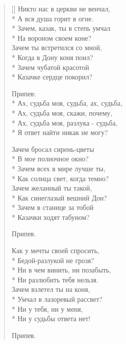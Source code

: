\documentclass[a4paper,oneside,14pt]{scrbook}
\begin{document}
        
    \settowidth{\versewidth}{Никто нас в церкви не венчал}
    \begin{verse}[\versewidth]
        Никто нас в церкви не венчал,\\*
        А вся душа горит в огне.\\*
        Зачем, казак, ты в степь умчал\\*
        На вороном своем коне?\\
        Зачем ты встретился со мной,\\*
        Когда в Дону коня поил?\\*
        Зачем чубатой красотой\\*
        Казачке сердце покорил? 

        \vin Припев:\\*
        \vin Ах, судьба моя, судьба, ах, судьба,\\*
        \vin Ах, судьба моя, скажи, почему,\\*
        \vin Ах, судьба моя, разлука - судьба,\\*
        \vin Я ответ найти никак не могу?

        Зачем бросал сирень-цветы\\*
        В мое полночное окно?\\*
        Зачем всех в мире лучше ты,\\*
        Как солнца свет, когда темно?\\
        Зачем желанный ты такой,\\*
        Как синеглазый вешний Дон?\\*
        Зачем в станице за тобой\\*
        Казачки ходят табуном? 

        \vin Припев. 
        
        Как у мечты своей спросить,\\*
        Бедой-разлукой не грозя?\\*
        Ни в чем винить, ни позабыть,\\*
        Ни разлюбить тебя нельзя.\\
        Зачем взлетел ты на коня,\\*
        Умчал в лазоревый рассвет?\\*
        Ни у тебя, ни у меня,\\*
        Ни у судьбы ответа нет!        

        \vin Припев. 
    \end{verse}
\end{document}
